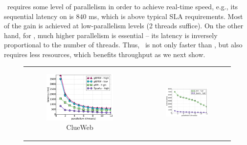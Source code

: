 \alg\ requires some level of parallelism in order to achieve real-time speed, e.g., its sequential
latency on \cw\/  is $840$ ms, which is  above typical SLA requirements. Most of the gain is achieved at low-parallelism levels (2 threads suffice). 
On the other hand, for \pBMW, much higher parallelism is essential -- its latency is inversely proportional to the number of threads. Thus, \alg\ is not only faster 
than \pBMW, but also requires less resources, which benefits throughput as we next show.

\begin{figure}[tbh]
\centering
\begin{tabular}{ccc}
      \begin{subfigure}[t]{0.4\textwidth}
         \includegraphics[width=\textwidth]{figures/latency_12terms_clueweb.pdf}
        \caption[]{ClueWeb}
      \end{subfigure} 
& 
	\hspace{0.1\textwidth}
& 
      \begin{subfigure}[t]{0.4\textwidth}
      \includegraphics[width=\textwidth]{figures/latency_12terms_cluewebX10.pdf}

\end{subfigure}
\end{tabular}
\end{figure}
